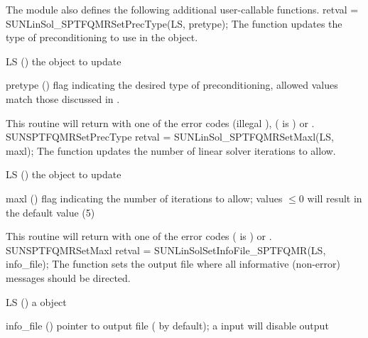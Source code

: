 The {\sunlinsolsptfqmr} module also defines the following additional
user-callable functions.
%
%
{
  retval = SUNLinSol\_SPTFQMRSetPrecType(LS, pretype);
}
{
  The function  updates the type of
  preconditioning to use in the {\sunlinsolsptfqmr} object.
}
{
  \begin{args}[pretype]
  \item[LS] ()
    the {\sunlinsolsptfqmr} object to update
  \item[pretype] ()
    flag indicating the desired type of preconditioning, allowed
    values match those discussed in .
  \end{args}
}
{
  This routine will return with one of the error codes
   (illegal ), 
  ( is ) or .
}
{}
{SUNSPTFQMRSetPrecType}
%
%
{
  retval = SUNLinSol\_SPTFQMRSetMaxl(LS, maxl);
}
{
  The function  updates the number of
  linear solver iterations to allow.
}
{
  \begin{args}[maxl]
  \item[LS] ()
    the {\sunlinsolsptfqmr} object to update
  \item[maxl] ()
    flag indicating the number of iterations to allow; values $\le0$
    will result in the default value (5)
  \end{args}
}
{
  This routine will return with one of the error codes
   ( is ) or .
}
{}
{SUNSPTFQMRSetMaxl}
%
%
{
  retval = SUNLinSolSetInfoFile\_SPTFQMR(LS, info\_file);
}
{
  The function  sets the
  output file where all informative (non-error) messages should be directed.
}
{
  \begin{args}
    \item[LS] ()
      a {\sunnonlinsol} object
    \item[info\_file] () pointer to output file ( by default);
      a  input will disable output
  \end{args}
}
